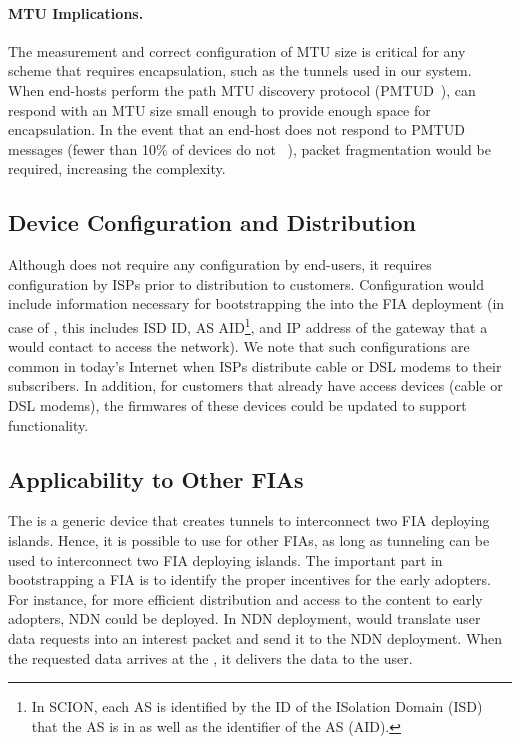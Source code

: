 \paragraph{MTU Implications.} The measurement and correct configuration of MTU
size is critical for any scheme that requires encapsulation, such as the
tunnels used in our system. When end-hosts perform the path MTU discovery
protocol (PMTUD~\cite{rfc1191}), \name can respond with an MTU size small
enough to provide enough space for encapsulation. In the event that an end-host
does not respond to PMTUD messages (fewer than 10\% of devices do not
~\cite{Luckie2010}), packet fragmentation would be required, increasing the
complexity.

\subsection{Device Configuration and Distribution}

Although \name does not require any configuration by end-users, it requires
configuration by ISPs prior to distribution to customers.  Configuration would
include information necessary for bootstrapping the \name into the FIA
deployment (\ie in case of \scion, this includes \scion ISD ID, AS
AID\footnote{In SCION, each AS is identified by the ID of the ISolation Domain
(ISD) that the AS is in as well as the identifier of the AS (AID).}, and IP
address of the gateway that a \name would contact to access the \scion
network). We note that such configurations are common in today's Internet when
ISPs distribute cable or DSL modems to their subscribers. In addition, for
customers that already have access devices (\ie cable or DSL modems), the
firmwares of these devices could be updated to support \name functionality.

\subsection{Applicability to Other FIAs}

The \name is a generic device that creates tunnels to interconnect two FIA
deploying islands. Hence, it is possible to use \name for other FIAs, as long
as tunneling can be used to interconnect two FIA deploying islands. The
important part in bootstrapping a FIA is to identify the proper incentives for
the early adopters. For instance, for more efficient distribution and access to
the content to early adopters, NDN could be deployed. In NDN deployment, \name
would translate user data requests into an interest packet and send it to the
NDN deployment. When the requested data arrives at the \name, it delivers the
data to the user.

